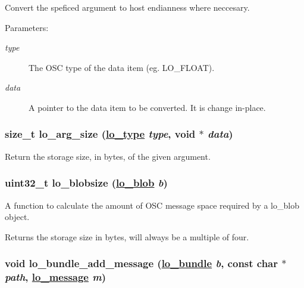 Convert the speficed argument to host endianness where neccesary. 

\begin{Desc}
\item[Parameters:]
\begin{description}
\item[{\em type}]The OSC type of the data item (eg. LO\_\-FLOAT). \item[{\em data}]A pointer to the data item to be converted. It is change in-place. \end{description}
\end{Desc}
\hypertarget{group__liblolowlevel_gf793bbd32346a91d7d680d91ae68d1bd}{
\subsubsection[lo\_\-arg\_\-size]{\setlength{\rightskip}{0pt plus 5cm}size\_\-t lo\_\-arg\_\-size (\hyperlink{group__liblo_g11838c576b0197c255ce805fd7434736}{lo\_\-type} {\em type}, void $\ast$ {\em data})}}
\label{group__liblolowlevel_gf793bbd32346a91d7d680d91ae68d1bd}


Return the storage size, in bytes, of the given argument. 

\hypertarget{group__liblolowlevel_g2315f71c3832c365bce25d9b21726043}{
\subsubsection[lo\_\-blobsize]{\setlength{\rightskip}{0pt plus 5cm}uint32\_\-t lo\_\-blobsize (\hyperlink{lo__types_8h_8e780f8c09e3e4dd737fe249f11d16fc}{lo\_\-blob} {\em b})}}
\label{group__liblolowlevel_g2315f71c3832c365bce25d9b21726043}


A function to calculate the amount of OSC message space required by a lo\_\-blob object. 

Returns the storage size in bytes, will always be a multiple of four. \hypertarget{group__liblolowlevel_g44e0e03554e91e76e5856e99fbb8afad}{
\subsubsection[lo\_\-bundle\_\-add\_\-message]{\setlength{\rightskip}{0pt plus 5cm}void lo\_\-bundle\_\-add\_\-message (\hyperlink{lo__types_8h_96254950ad34e9cfbf8a6613fc74025b}{lo\_\-bundle} {\em b}, const char $\ast$ {\em path}, \hyperlink{lo__types_8h_d126083c98d941f00eb72d1690b38d63}{lo\_\-message} {\em m})}}
\label{group__liblolowlevel_g44e0e03554e91e76e5856e99fbb8afad}


